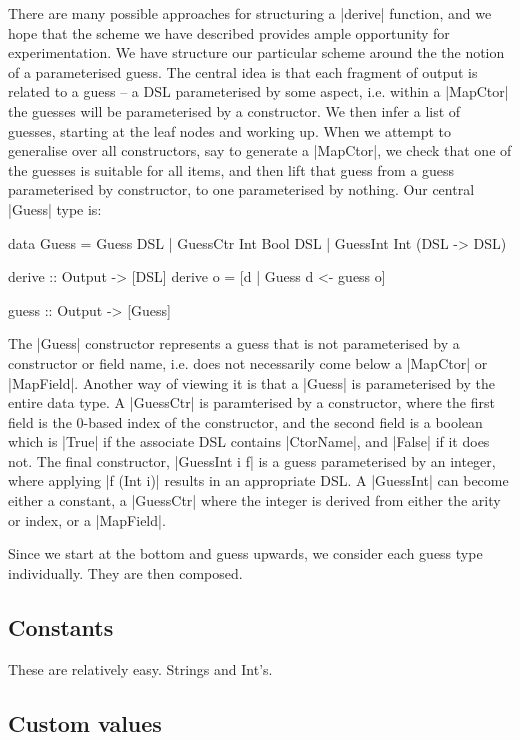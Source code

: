 \documentclass[preprint,draft]{sigplanconf}
\begin{document}
There are many possible approaches for structuring a |derive| function, and we hope that the scheme we have described provides ample opportunity for experimentation. We have structure our particular scheme around the the notion of a parameterised guess. The central idea is that each fragment of output is related to a guess -- a DSL parameterised by some aspect, i.e. within a |MapCtor| the guesses will be parameterised by a constructor. We then infer a list of guesses, starting at the leaf nodes and working up. When we attempt to generalise over all constructors, say to generate a |MapCtor|, we check that one of the guesses is suitable for all items, and then lift that guess from a guess parameterised by constructor, to one parameterised by nothing. Our central |Guess| type is:

\begin{code}
data Guess  =  Guess DSL
            |  GuessCtr Int Bool DSL
            |  GuessInt Int (DSL -> DSL)

derive :: Output -> [DSL]
derive o = [d | Guess d <- guess o]

guess :: Output -> [Guess]
\end{code}

The |Guess| constructor represents a guess that is not parameterised by a constructor or field name, i.e. does not necessarily come below a |MapCtor| or |MapField|. Another way of viewing it is that a |Guess| is parameterised by the entire data type. A |GuessCtr| is paramterised by a constructor, where the first field is the 0-based index of the constructor, and the second field is a boolean which is |True| if the associate DSL contains |CtorName|, and |False| if it does not. The final constructor, |GuessInt i f| is a guess parameterised by an integer, where applying |f (Int i)| results in an appropriate DSL. A |GuessInt| can become either a constant, a |GuessCtr| where the integer is derived from either the arity or index, or a |MapField|.

Since we start at the bottom and guess upwards, we consider each guess type individually. They are then composed.

\subsection{Constants}

These are relatively easy. Strings and Int's.

\subsection{Custom values}
\end{document}
